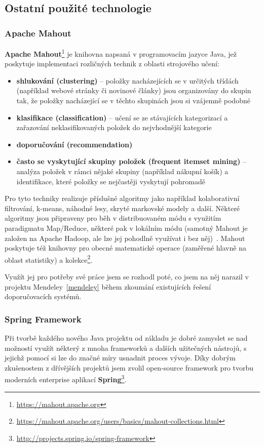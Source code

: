 \documentclass[thesis=M,czech]{FITthesis}[2014/05/07]
\begin{document}
\subsection{Ostatní použité technologie}

\subsubsection{Apache Mahout}
\label{mahout}
\textbf{Apache Mahout}\footnote{\url{https://mahout.apache.org}} je knihovna napsaná v programovacím jazyce Java, jež poskytuje implementaci rozličných technik z oblasti strojového učení:

\begin{itemize}
	\item \textbf{shlukování (clustering)} – položky nacházejících se v určitých třídách (například webové stránky či novinové články) jsou organizovány do skupin tak, že položky nacházející se v těchto skupinách jsou si vzájemně podobné
	\item \textbf{klasifikace (classification)} – učení se ze stávajících kategorizací a zařazování neklasifikovaných položek do nejvhodnější kategorie
	\item \textbf{doporučování (recommendation)}
	\item \textbf{často se vyskytující skupiny položek (frequent itemset mining)} – analýza položek v rámci nějaké skupiny (například nákupní košík) a identifikace, které položky se nejčastěji vyskytují pohromadě
\end{itemize}

Pro tyto techniky realizuje příslušné algoritmy jako například kolaborativní filtrování, k-means, náhodné lesy, skryté markovské modely a další. Některé algoritmy jsou připraveny pro běh v distribuovaném módu s využitím paradigmatu Map/Reduce, některé pak v lokálním módu (samotný Mahout je založen na Apache Hadoop, ale lze jej pohodlně využívat i bez něj)~\cite{mahouttut}. Mahout poskytuje též knihovny pro obecné matematické operace (zaměřené hlavně na oblast statistiky) a kolekce\footnote{\url{https://mahout.apache.org/users/basics/mahout-collections.html}}. 

Využít jej pro potřeby své práce jsem se rozhodl poté, co jsem na něj narazil v projektu Mendeley~\ref{mendeley} během zkoumání existujících řešení doporučovacích systémů. 

\subsubsection{Spring Framework}
Při tvorbě každého nového Java projektu od základu je dobré zamyslet se nad možností využít některý z mnoha frameworků a dalších užitečných nástrojů, s jejichž pomocí si lze do značné míry usnadnit proces vývoje. Díky dobrým zkušenostem z dřívějších projektů jsem zvolil open-source framework pro tvorbu moderních enterprise aplikací \textbf{Spring}\footnote{\url{http://projects.spring.io/spring-framework}}. 
\end{document}
